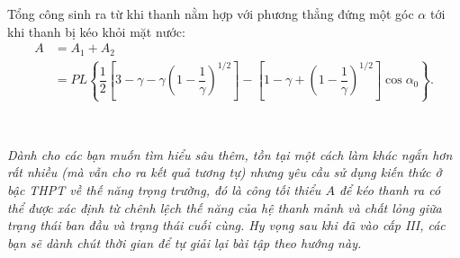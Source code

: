 Tổng công sinh ra từ khi thanh nằm hợp với phương thẳng đứng một góc $\alpha$ tới khi thanh bị kéo khỏi mặt nước:
\begin{equation}
\begin{split}
    A &= A_1 + A_2 \\
    &= P L \left\{ \dfrac{1}{2} \left[ 3 - \gamma - \gamma \left( 1 - \dfrac{1}{\gamma} \right)^{1/2} \right] -\left[ 1 - \gamma + \left( 1 - \dfrac{1}{\gamma} \right)^{1/2} \right] \cos \alpha_0 \right\}.
    \nonumber
\end{split}
\end{equation}

\ \  

\textit{Dành cho các bạn muốn tìm hiểu sâu thêm, tồn tại một cách làm khác ngắn hơn rất nhiều (mà vẫn cho ra kết quả tương tự) nhưng yêu cầu sử dụng kiến thức ở bậc THPT về thế năng trọng trường, đó là công tối thiểu $A$ để kéo thanh ra có thể được xác định từ chênh lệch thế năng của hệ thanh mảnh và chất lỏng giữa trạng thái ban đầu và trạng thái cuối cùng. Hy vọng sau khi đã vào cấp III, các bạn sẽ dành chút thời gian để tự giải lại bài tập theo hướng này.}